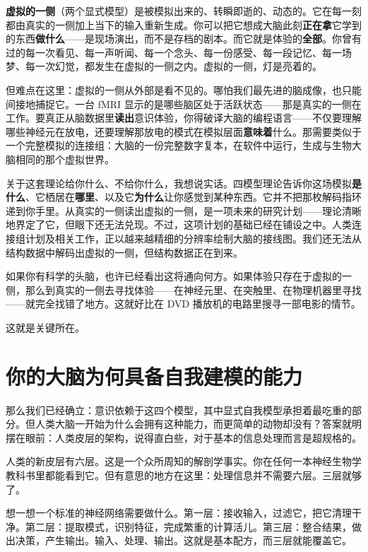\documentclass[11pt, twoside, openright]{book}
\begin{document}
\textbf{虚拟的一侧}（两个显式模型）是被模拟出来的、转瞬即逝的、动态的。它在每一刻都由真实的一侧加上当下的输入重新生成。你可以把它想成大脑此刻\textbf{正在拿}它学到的东西\textbf{做什么}------是现场演出，而不是存档的剧本。而它就是体验的\textbf{全部}。你曾有过的每一次看见、每一声听闻、每一个念头、每一份感受、每一段记忆、每一场梦、每一次幻觉，都发生在虚拟的一侧之内。虚拟的一侧，灯是亮着的。

但难点在这里：虚拟的一侧从外部是看不见的。哪怕我们最先进的脑成像，也只能间接地捕捉它。一台 fMRI 显示的是哪些脑区处于活跃状态------那是真实的一侧在工作。要真正从脑数据里\textbf{读出}意识体验，你得破译大脑的编程语言------不仅要理解哪些神经元在放电，还要理解那放电的模式在模拟层面\textbf{意味着}什么。那需要类似于一个完整模拟的连接组：大脑的一份完整数字复本，在软件中运行，生成与生物大脑相同的那个虚拟世界。

关于这套理论给你什么、不给你什么，我想说实话。四模型理论告诉你这场模拟\textbf{是什么}、它栖居在\textbf{哪里}、以及它\textbf{为什么}让你感觉到某种东西。它并不把那枚解码指环递到你手里。从真实的一侧读出虚拟的一侧，是一项未来的研究计划------理论清晰地界定了它，但眼下还无法兑现。不过，这项计划的基础已经在铺设之中。人类连接组计划及相关工作，正以越来越精细的分辨率绘制大脑的接线图。我们还无法从结构数据中解码出虚拟的一侧，但结构数据正在到来。

如果你有科学的头脑，也许已经看出这将通向何方。如果体验只存在于虚拟的一侧，那么到真实的一侧去寻找体验------在神经元里、在突触里、在物理机器里寻找------就完全找错了地方。这就好比在 DVD 播放机的电路里搜寻一部电影的情节。

这就是关键所在。

\section*{你的大脑为何具备自我建模的能力}

那么我们已经确立：意识依赖于这四个模型，其中显式自我模型承担着最吃重的部分。但人类大脑一开始为什么会拥有这种能力，而更简单的动物却没有？答案就明摆在眼前：人类皮层的架构，说得直白些，对于基本的信息处理而言是超规格的。

人类的新皮层有六层。这是一个众所周知的解剖学事实。你在任何一本神经生物学教科书里都能看到它。但有意思的地方在这里：处理信息并不需要六层。三层就够了。

想一想一个标准的神经网络需要做什么。第一层：接收输入，过滤它，把它清理干净。第二层：提取模式，识别特征，完成繁重的计算活儿。第三层：整合结果，做出决策，产生输出。输入、处理、输出。这就是基本配方，而三层就能覆盖它。
\end{document}
